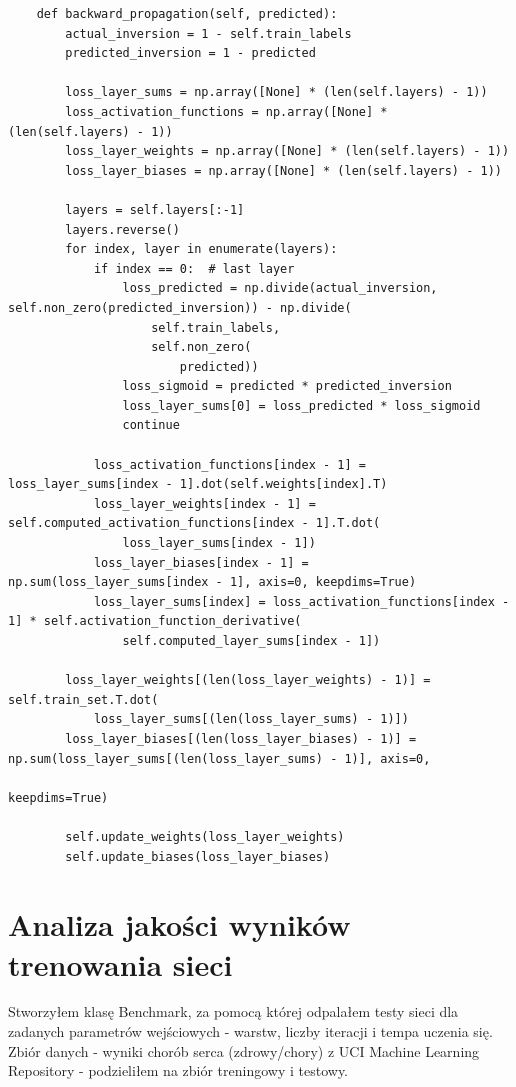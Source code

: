 \documentclass[12pt]{article}
\begin{document}
\noindent
    \begin{verbatim}
    def backward_propagation(self, predicted):
        actual_inversion = 1 - self.train_labels
        predicted_inversion = 1 - predicted

        loss_layer_sums = np.array([None] * (len(self.layers) - 1))
        loss_activation_functions = np.array([None] * (len(self.layers) - 1))
        loss_layer_weights = np.array([None] * (len(self.layers) - 1))
        loss_layer_biases = np.array([None] * (len(self.layers) - 1))

        layers = self.layers[:-1]
        layers.reverse()
        for index, layer in enumerate(layers):
            if index == 0:  # last layer
                loss_predicted = np.divide(actual_inversion, self.non_zero(predicted_inversion)) - np.divide(
                    self.train_labels,
                    self.non_zero(
                        predicted))
                loss_sigmoid = predicted * predicted_inversion
                loss_layer_sums[0] = loss_predicted * loss_sigmoid
                continue

            loss_activation_functions[index - 1] = loss_layer_sums[index - 1].dot(self.weights[index].T)
            loss_layer_weights[index - 1] = self.computed_activation_functions[index - 1].T.dot(
                loss_layer_sums[index - 1])
            loss_layer_biases[index - 1] = np.sum(loss_layer_sums[index - 1], axis=0, keepdims=True)
            loss_layer_sums[index] = loss_activation_functions[index - 1] * self.activation_function_derivative(
                self.computed_layer_sums[index - 1])

        loss_layer_weights[(len(loss_layer_weights) - 1)] = self.train_set.T.dot(
            loss_layer_sums[(len(loss_layer_sums) - 1)])
        loss_layer_biases[(len(loss_layer_biases) - 1)] = np.sum(loss_layer_sums[(len(loss_layer_sums) - 1)], axis=0,
                                                                 keepdims=True)

        self.update_weights(loss_layer_weights)
        self.update_biases(loss_layer_biases)
    \end{verbatim}

\section{Analiza jakości wyników trenowania sieci}
Stworzyłem klasę Benchmark, za pomocą której odpalałem testy sieci dla zadanych parametrów wejściowych -  warstw, liczby iteracji i tempa uczenia się. Zbiór danych - wyniki chorób serca (zdrowy/chory) z UCI Machine Learning Repository - podzieliłem na zbiór treningowy i testowy.
\end{document}
